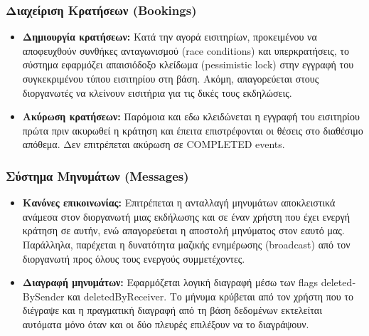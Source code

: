 \documentclass[12pt]{fphw}
\newcommand{\en}[1]{\foreignlanguage{english}{#1}}
\begin{document}
\subsubsection{Διαχείριση Κρατήσεων (\en{Bookings})}
\begin{itemize}[leftmargin=*]
    \item \textbf{Δημιουργία κρατήσεων:} Κατά την αγορά εισιτηρίων, προκειμένου να αποφευχθούν συνθήκες ανταγωνισμού (\en{race conditions}) και υπερκρατήσεις, το σύστημα εφαρμόζει απαισιόδοξο κλείδωμα (\en{pessimistic lock}) στην εγγραφή του συγκεκριμένου τύπου εισιτηρίου στη βάση. Ακόμη, απαγορεύεται στους διοργανωτές να κλείνουν εισιτήρια για τις δικές τους εκδηλώσεις.
    \item \textbf{Ακύρωση κρατήσεων:} Παρόμοια και εδω κλειδώνεται η εγγραφή του εισιτηρίου πρώτα πριν ακυρωθεί η κράτηση και έπειτα επιστρέφονται οι θέσεις στο διαθέσιμο απόθεμα. Δεν επιτρέπεται ακύρωση σε COMPLETED events.
\end{itemize}

\subsubsection{Σύστημα Μηνυμάτων (\en{Messages})}
\begin{itemize}[leftmargin=*]
    \item \textbf{Κανόνες επικοινωνίας:} Επιτρέπεται η ανταλλαγή μηνυμάτων αποκλειστικά ανάμεσα στον διοργανωτή μιας εκδήλωσης και σε έναν χρήστη που έχει ενεργή κράτηση σε αυτήν, ενώ απαγορεύεται η αποστολή μηνύματος στον εαυτό μας. Παράλληλα, παρέχεται η δυνατότητα μαζικής ενημέρωσης (\en{broadcast}) από τον διοργανωτή προς όλους τους ενεργούς συμμετέχοντες.
    \item \textbf{Διαγραφή μηνυμάτων:} Εφαρμόζεται λογική διαγραφή μέσω των flags \en{deletedBySender} και \en{deletedByReceiver}. Το μήνυμα κρύβεται από τον χρήστη που το διέγραψε και η πραγματική διαγραφή από τη βάση δεδομένων εκτελείται αυτόματα μόνο όταν και οι δύο πλευρές επιλέξουν να το διαγράψουν.
\end{itemize}
\end{document}
